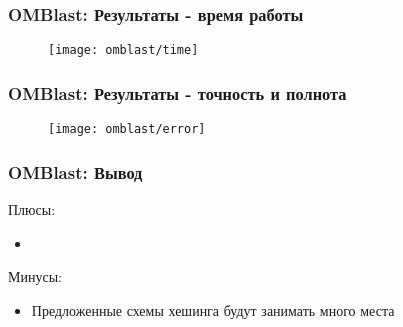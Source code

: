 \begin{frame}
\frametitle{OMBlast: Результаты - время работы}
  \begin{figure}
    \centering
    \texttt{[image: omblast/time]}
  \end{figure}

\end{frame}

\begin{frame}
\frametitle{OMBlast: Результаты - точность и полнота }
  \begin{figure}
    \centering
    \texttt{[image: omblast/error]}
  \end{figure}

\end{frame}

\begin{frame}
\frametitle{OMBlast: Вывод }
Плюсы:
\begin{itemize}
  \item 
\end{itemize}
Минусы:
\begin{itemize}
  \item Предложенные схемы хешинга будут занимать много места
\end{itemize}
\end{frame}

